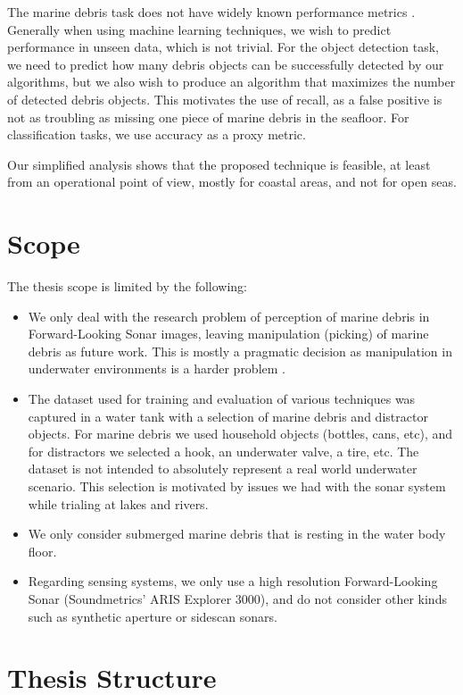 The marine debris task does not have widely known performance metrics \cite{sheavly2007marine}. Generally when using machine learning techniques, we wish to predict performance in unseen data, which is not trivial. For the object detection task, we need to predict how many debris objects can be successfully detected by our algorithms, but we also wish to produce an algorithm that maximizes the number of detected debris objects. This motivates the use of recall, as a false positive is not as troubling as missing one piece of marine debris in the seafloor. For classification tasks, we use accuracy as a proxy metric.

Our simplified analysis shows that the proposed technique is feasible, at least from an operational point of view, mostly for coastal areas, and not for open seas.

\section{Scope}

The thesis scope is limited by the following:

\begin{itemize}
    \item We only deal with the research problem of perception of marine debris in Forward-Looking Sonar images, leaving manipulation (picking) of marine debris as future work. This is mostly a pragmatic decision as manipulation in underwater environments is a harder problem \cite{ridao2014intervention}.
    \item The dataset used for training and evaluation of various techniques was captured in a water tank with a selection of marine debris and distractor objects. For marine debris we used household objects (bottles, cans, etc), and for distractors we selected a hook, an underwater valve, a tire, etc. The dataset is not intended to absolutely represent a real world underwater scenario. This selection is motivated by issues we had with the sonar system while trialing at lakes and rivers.
    \item We only consider submerged marine debris that is resting in the water body floor.
    \item Regarding sensing systems, we only use a high resolution Forward-Looking Sonar (Soundmetrics' ARIS Explorer 3000), and do not consider other kinds such as synthetic aperture or sidescan sonars.
\end{itemize}

\section{Thesis Structure}

